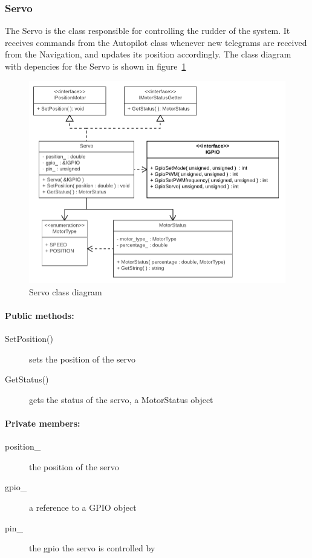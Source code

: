 \subsubsection{Servo}

The Servo is the class responsible for controlling the rudder of the system. It receives commands from the Autopilot class whenever new telegrams are received from the Navigation, and updates its position accordingly. The class diagram with depencies for the Servo is shown in figure~\ref{fig:servo}

\begin{figure}[H]
\centering
\includegraphics[max width=1\linewidth]{Images/Design/Servo_class_diagram}
\caption{Servo class diagram}
\label{fig:servo}
\end{figure}

\paragraph{Public methods:}
\begin{adjustwidth}{2.5em}{0pt}\begin{description}
		\item [SetPosition()] sets the position of the servo
		\item [GetStatus()] gets the status of the servo, a MotorStatus object
\end{description}\end{adjustwidth}

\paragraph{Private members:}
\begin{adjustwidth}{2.5em}{0pt}\begin{description}
		\item [position_] the position of the servo
		\item [gpio_] a reference to a GPIO object
		\item [pin_] the gpio the servo is controlled by
\end{description}\end{adjustwidth}

